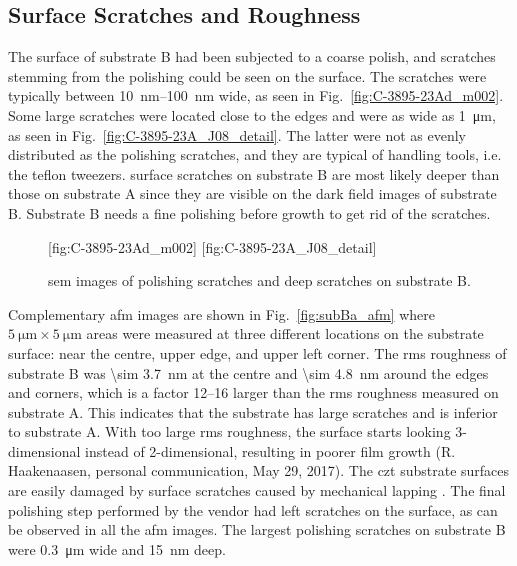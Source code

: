 \subsection{Surface Scratches and Roughness}
The surface of substrate B had been subjected to a coarse polish, and scratches stemming from the polishing could be seen on the surface. The scratches were typically between \SIrange{10}{100}{\nano\metre} wide, as seen in Fig.~\ref{fig:C-3895-23Ad_m002}. Some large scratches were located close to the edges and were as wide as \SI{1}{\micro\metre}, as seen in Fig.~\ref{fig:C-3895-23A_J08_detail}. The latter were not as evenly distributed as the polishing scratches, and they are typical of handling tools, i.e. the teflon tweezers.  surface scratches on substrate B are most likely deeper than those on substrate A since they are visible on the dark field images of substrate B. Substrate B needs a fine polishing before growth to get rid of the scratches.
\begin{figure}[htbp]
    \centering
    [fig:C-3895-23Ad_m002]
    [fig:C-3895-23A_J08_detail]
    \caption[\Ac{sem} images of scratches on substrate B.]{\Ac{sem} images of  polishing scratches and  deep scratches on substrate B.}
    \label{fig:SEM_C389523_scratches}
\end{figure}

Complementary \ac{afm} images are shown in Fig.~\ref{fig:subBa_afm} where $\SI{5}{\micro\metre}\times\SI{5}{\micro\metre}$ areas were measured at three different locations on the substrate surface: near the centre, upper edge, and upper left corner. The \ac{rms} roughness of substrate B was \SI{\sim 3.7}{\nano\metre} at the centre and \SI{\sim 4.8}{\nano\metre} around the edges and corners, which is a factor \SIrange{12}{16}{} larger than the \ac{rms} roughness measured on substrate A. This indicates that the substrate has large scratches and is inferior to substrate A. With too large \ac{rms} roughness, the surface starts looking 3-dimensional instead of 2-dimensional, resulting in poorer film growth (R. Haakenaasen, personal communication, May 29, 2017). The \ac{czt} substrate surfaces are easily damaged by surface scratches caused by mechanical lapping \citep{egan2009scanning}. The final polishing step performed by the vendor had left scratches on the surface, as can be observed in all the \ac{afm} images. The largest polishing scratches on substrate B were \SI{0.3}{\micro\metre} wide and \SI{15}{\nano\metre} deep.

